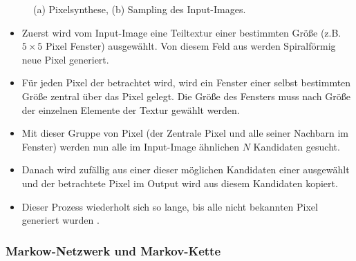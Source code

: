 \documentclass[12pt, a4paper,twoside,openright]{report} %
\begin{document}
\begin{figure}[H]
    \centering
    \qquad
    \caption{(a) Pixelsynthese, (b) Sampling des Input-Images.}%
\end{figure}


\begin{itemize}
    \item Zuerst wird vom Input-Image eine Teiltextur einer bestimmten Größe {(z.B. $5\times 5$ Pixel Fenster)} ausgewählt. Von diesem Feld aus werden Spiralförmig neue Pixel generiert.
    \item Für jeden Pixel der betrachtet wird, wird ein Fenster einer selbst bestimmten Größe zentral über das Pixel gelegt.
    Die Größe des Fensters muss nach Größe der einzelnen Elemente der Textur gewählt werden.
    \item Mit dieser Gruppe von Pixel {(der Zentrale Pixel und alle seiner Nachbarn im Fenster)} werden nun alle im Input-Image ähnlichen $N$ Kandidaten gesucht.
    \item Danach wird zufällig aus einer dieser möglichen Kandidaten einer ausgewählt und der betrachtete Pixel im Output wird aus diesem Kandidaten kopiert.
    \item Dieser Prozess wiederholt sich so lange, bis alle nicht bekannten Pixel generiert wurden \cite[S.4]{GomathiShah2009}.
\end{itemize}

\subsubsection{Markow-Netzwerk und Markov-Kette}
\end{document}
